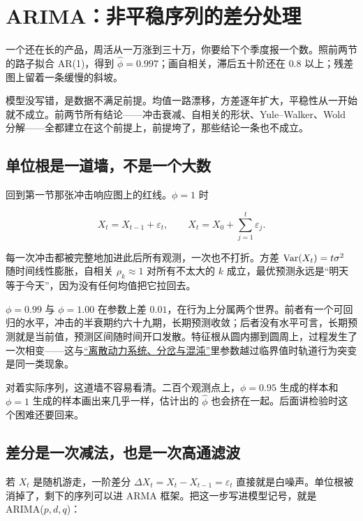 \section{ARIMA：非平稳序列的差分处理}
\label{sec:06-Random-Processes/06-ARMA-and-ARIMA/03}

一个还在长的产品，周活从一万涨到三十万，你要给下个季度报一个数。照前两节的路子拟合 AR(1)，得到 \(\hat\phi=0.997\)；画自相关，滞后五十阶还在 \(0.8\) 以上；残差图上留着一条缓慢的斜坡。

模型没写错，是数据不满足前提。均值一路漂移，方差逐年扩大，平稳性从一开始就不成立。前两节所有结论——冲击衰减、自相关的形状、Yule--Walker、Wold 分解——全都建立在这个前提上，前提垮了，那些结论一条也不成立。

\subsection{单位根是一道墙，不是一个大数}

回到第一节那张冲击响应图上的红线。\(\phi=1\) 时

\[
X_t=X_{t-1}+\varepsilon_t,\qquad X_t=X_0+\sum_{j=1}^{t}\varepsilon_j.
\]

每一次冲击都被完整地加进此后所有观测，一次也不打折。方差 \(\operatorname{Var}(X_t)=t\sigma^2\) 随时间线性膨胀，自相关 \(\rho_k\approx1\) 对所有不太大的 \(k\) 成立，最优预测永远是``明天等于今天''，因为没有任何均值把它拉回去。

\(\phi=0.99\) 与 \(\phi=1.00\) 在参数上差 \(0.01\)，在行为上分属两个世界。前者有一个可回归的水平，冲击的半衰期约六十九期，长期预测收敛；后者没有水平可言，长期预测就是当前值，预测区间随时间开口发散。特征根从圆内挪到圆周上，过程发生了一次相变——这与\hyperref[sec:15-Differential-Equations-and-Dynamical-Systems/02-Stability-and-Dynamical-Systems/03]{``离散动力系统、分岔与混沌''}里参数越过临界值时轨道行为突变是同一类现象。

对着实际序列，这道墙不容易看清。二百个观测点上，\(\phi=0.95\) 生成的样本和 \(\phi=1\) 生成的样本画出来几乎一样，估计出的 \(\hat\phi\) 也会挤在一起。后面讲检验时这个困难还要回来。

\subsection{差分是一次减法，也是一次高通滤波}

若 \(X_t\) 是随机游走，一阶差分 \(\Delta X_t=X_t-X_{t-1}=\varepsilon_t\) 直接就是白噪声。单位根被消掉了，剩下的序列可以进 ARMA 框架。把这一步写进模型记号，就是 ARIMA(\(p,d,q\))：


